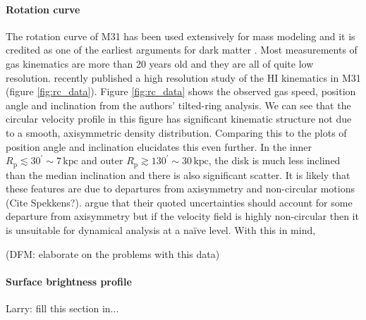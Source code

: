 \documentclass[preprint]{aastex}
\newcommand{\Fig}[1]{Figure \ref{fig:#1}}
\newcommand{\Rband}{\emph{R}-band}
\newcommand{\unit}[1]{\,\mathrm{#1}}
\newcommand{\kpc}{\unit{kpc}}
\begin{document}
\paragraph{Rotation curve}

\label{sect:rcdata}

The rotation curve of M31 has been used extensively for mass modeling and it is
credited as one of the earliest arguments for dark matter \citep{Rubin:1970}.
Most measurements of gas kinematics are more than 20 years old and they are all
of quite low resolution.  \citet{Chemin:2009} recently published a high resolution
study of the HI kinematics in M31 (figure \ref{fig:rc_data}).  \Fig{rc_data}
shows the observed gas speed, position angle and inclination from the authors'
tilted-ring analysis.  We can see that the circular velocity profile in this
figure has significant kinematic structure not due to a smooth, axisymmetric
density distribution.  Comparing this to the plots of position angle and inclination
elucidates this even further.  In the inner $R_\mathrm{p} \lesssim 30^\prime \sim 7 \kpc$
and outer $R_\mathrm{p} \gtrsim 130^\prime \sim 30 \kpc$, the disk is much less
inclined than the median inclination and there is also significant scatter.
It is likely that these features are due to departures from axisymmetry and
non-circular motions (Cite Spekkens?).  \citet{Chemin:2009} argue that their
quoted uncertainties should account for some departure from axisymmetry but if
the velocity field is highly non-circular then it is unsuitable for dynamical
analysis at a na\"ive level.  With this in mind,


(DFM: elaborate on the problems with this data)


\paragraph{Surface brightness profile}

Larry: fill this section in...

\end{document}
